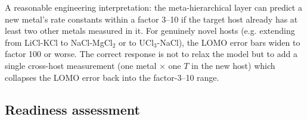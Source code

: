 \documentclass[12pt]{article}
\theoremstyle{plain}
\theoremstyle{definition}
\theoremstyle{remark}
\begin{document}
A reasonable engineering interpretation:  the meta-hierarchical layer
can predict a new metal's rate constants within a factor 3--10 if the
target host already has at least two other metals measured in it.  For
genuinely novel hosts (e.g. extending from LiCl-KCl to NaCl-MgCl$_2$ or
to UCl$_3$-NaCl), the LOMO error bars widen to factor 100 or worse.  The
correct response is not to relax the model but to add a single
cross-host measurement (one metal $\times$ one $T$ in the new host) which
collapses the LOMO error back into the factor-3--10 range.

\subsection{Readiness assessment}\label{sec:pred:readiness}
\end{document}
